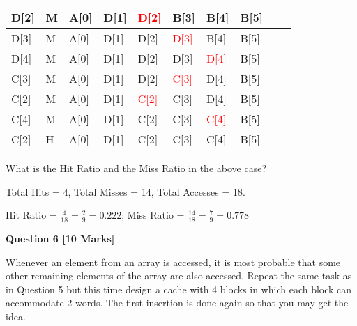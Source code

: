 \documentclass[addpoints]{exam}
\begin{document}
\begin{sloppypar}
\begin{questions}
\begin{tabular}{|m{15mm} | m{17mm} | m{8.5mm} |m{8.5mm} |m{8.5mm} |m{8.5mm} |m{8.5mm} |m{8.5mm} |m{8.5mm} |m{8.5mm} |}
        D[2] & M & A[0] & D[1] & \textcolor{red}{D[2]} & B[3] & B[4] & B[5] & &\\ \hline
        D[3] & M & A[0] & D[1] & D[2] & \textcolor{red}{D[3]} & B[4] & B[5] & &\\ \hline
        D[4] & M & A[0] & D[1] & D[2] & D[3] & \textcolor{red}{D[4]} & B[5] & &\\ \hline
        C[3] & M & A[0] & D[1] & D[2] & \textcolor{red}{C[3]} & D[4] & B[5] & &\\ \hline
        C[2] & M & A[0] & D[1] & \textcolor{red}{C[2]} & C[3] & D[4] & B[5] & &\\ \hline
        C[4] & M & A[0] & D[1] & C[2] & C[3] & \textcolor{red}{C[4]} & B[5] & &\\ \hline
        C[2] & H & A[0] & D[1] & \textcolor{my_green}{C[2]} & C[3] & C[4] & B[5] & &\\ \hline
    \end{tabular}   

    What is the Hit Ratio and the Miss Ratio in the above case?
    \begin{solution}
        Total Hits = 4, Total Misses = 14, Total Accesses = 18.

        Hit Ratio = $ \displaystyle\frac{4}{18} = \displaystyle\frac{2}{9} = 0.222 $; Miss Ratio = $ \displaystyle\frac{14}{18} = \displaystyle\frac{7}{9} = 0.778 $
    \end{solution}
    \pagebreak
    \question[10]
    \begin{center}
        \textbf{Question 6 [10 Marks]}
    \end{center}
    Whenever an element from an array is accessed, it is most probable that some other remaining elements of the array are also accessed. Repeat the same task as in Question 5 but this time design a cache with 4 blocks in which each block can accommodate 2 words. The first insertion is done again so that you may get the idea.


\end{questions}
\end{sloppypar}
\end{document}
